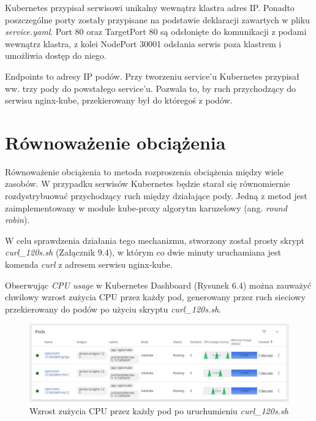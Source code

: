 Kubernetes przypisał serwisowi unikalny wewnątrz klastra adres IP. Ponadto poszczególne porty zostały przypisane na podstawie deklaracji zawartych w pliku \textit{service.yaml}. Port 80 oraz TargetPort 80 są odsłonięte do komunikacji z podami wewnątrz klastra, z kolei NodePort 30001 odsłania serwis poza klastrem i umożliwia dostęp do niego. 

Endpoints to adresy IP podów. Przy tworzeniu service'u Kubernetes przypisał ww. trzy pody do powstałego service'u. Pozwala to, by ruch przychodzący do serwisu nginx-kube, przekierowany był do któregoś z podów. 

 
\section{Równoważenie obciążenia}

Równoważenie obciążenia to metoda rozproszenia obciążenia między wiele zasobów. W przypadku serwisów Kubernetes będzie starał się równomiernie rozdystrybuować przychodzący ruch między działające pody. Jedną z metod jest zaimplementowany w module kube-proxy algorytm karuzelowy (ang. \textit{round robin}). 

W celu sprawdzenia działania tego mechanizmu, stworzony został prosty skrypt \textit{curl\_120s.sh} (Załącznik 9.4), w którym co dwie minuty uruchamiana jest komenda \textit{curl} z adresem serwisu nginx-kube.

Obserwując \textit{CPU usage} w Kubernetes Dashboard (Rysunek 6.4) można zauważyć chwilowy wzrost zużycia CPU przez każdy pod, generowany przez ruch sieciowy przekierowany do podów po użyciu skryptu \textit{curl\_120s.sh}.

\begin{figure}[h]
    \centering
    \includegraphics[width=1\textwidth]{img/load1.jpg}
    \caption{Wzrost zużycia CPU przez każdy pod po uruchumieniu \textit{curl\_120s.sh}}
\end{figure}


